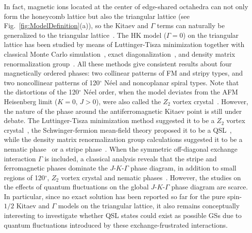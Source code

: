 \documentclass[aps,prb,reprint,amsfonts,amsmath,amssymb,showpacs,groupedaddress,superscriptaddress]{revtex4-1}
\begin{document}
In fact, magnetic ions located at the center of edge-shared octahedra can not only form the honeycomb lattice but also the triangular lattice (see Fig.~\ref{fig:ModelDefinition}(a)), so the Kitaev and $\Gamma$ terms can naturally be generalized to the triangular lattice~\cite{PhysRevB.89.014414,PhysRevB.93.104417}. The HK model ($\Gamma=0$) on the triangular lattice has been studied by means of Luttinger-Tisza minimization together with classical Monte Carlo simulation~\cite{PhysRevB.93.104417}, exact diagonalization~\cite{KaiLi2015}, and density matrix renormalization group~\cite{JPSJ.85.114710,PhysRevX.9.021017}. All these methods give consistent results about four magnetically ordered phases: two collinear patterns of FM and stripy types, and two noncollinear patterns of 120$^\circ$ N\'{e}el and noncoplanar spiral types. Note that the distortions of the 120$^\circ$ N\'{e}el order, when the model deviates from the AFM Heisenberg limit ($K=0$, $J>0$), were also called the $Z_{2}$ vortex crystal~\cite{PhysRevB.93.104417,JPSJ.85.114710}. However, the nature of the phase around the antiferromagnetic Kitaev point is still under debate. The Luttinger-Tisza minimization method suggested it to be a $Z_{2}$ vortex crystal~\cite{PhysRevB.93.104417}, the Schwinger-fermion mean-field theory proposed it to be a QSL~\cite{KaiLi2015}, while the density matrix renormalization group calculations suggested it to be a nematic phase~\cite{JPSJ.85.114710} or a stripe phase~\cite{PhysRevX.9.021017}. When the symmetric off-diagonal exchange interaction $\Gamma$ is included, a classical analysis reveals that the stripe and ferromagnetic phases dominate the $J$-$K$-$\Gamma$ phase diagram, in addition to small regions of 120$^\circ$, $Z_{2}$ vortex crystal and nematic phases~\cite{PhysRevB.92.165108}. However, the studies on the effects of quantum fluctuations on the global $J$-$K$-$\Gamma$ phase diagram are scarce. In particular, since no exact solution has been reported so far for the pure spin-$1/2$ Kitaev and $\Gamma$ models on the triangular lattice, it also remains conceptually interesting to investigate whether QSL states could exist as possible GSs due to quantum fluctuations introduced by these exchange-frustrated interactions.
\end{document}
